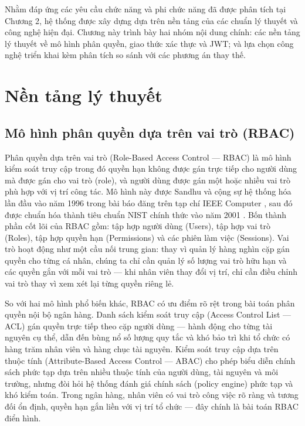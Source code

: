 \documentclass[../DoAn.tex]{subfiles}
\begin{document}
Nhằm đáp ứng các yêu cầu chức năng và phi chức năng đã được phân tích tại Chương 2, hệ thống được xây dựng dựa trên nền tảng của các chuẩn lý thuyết và công nghệ hiện đại. Chương này trình bày hai nhóm nội dung chính: các nền tảng lý thuyết về mô hình phân quyền, giao thức xác thực và JWT; và lựa chọn công nghệ triển khai kèm phân tích so sánh với các phương án thay thế.

\section{Nền tảng lý thuyết}
\label{section:3.1}

\subsection{Mô hình phân quyền dựa trên vai trò (RBAC)}
\label{subsection:3.1.1}

Phân quyền dựa trên vai trò (Role-Based Access Control — RBAC) là mô hình kiểm soát truy cập trong đó quyền hạn không được gán trực tiếp cho người dùng mà được gán cho vai trò (role), và người dùng được gán một hoặc nhiều vai trò phù hợp với vị trí công tác. Mô hình này được Sandhu và cộng sự hệ thống hóa lần đầu vào năm 1996 trong bài báo đăng trên tạp chí IEEE Computer \cite{sandhu1996rbac}, sau đó được chuẩn hóa thành tiêu chuẩn NIST chính thức vào năm 2001 \cite{ferraiolo2001rbac}. Bốn thành phần cốt lõi của RBAC gồm: tập hợp người dùng (Users), tập hợp vai trò (Roles), tập hợp quyền hạn (Permissions) và các phiên làm việc (Sessions). Vai trò hoạt động như một cầu nối trung gian: thay vì quản lý hàng nghìn cặp gán quyền cho từng cá nhân, chúng ta chỉ cần quản lý số lượng vai trò hữu hạn và các quyền gắn với mỗi vai trò — khi nhân viên thay đổi vị trí, chỉ cần điều chỉnh vai trò thay vì xem xét lại từng quyền riêng lẻ.

So với hai mô hình phổ biến khác, RBAC có ưu điểm rõ rệt trong bài toán phân quyền nội bộ ngân hàng. Danh sách kiểm soát truy cập (Access Control List — ACL) gán quyền trực tiếp theo cặp người dùng — hành động cho từng tài nguyên cụ thể, dẫn đến bùng nổ số lượng quy tắc và khó bảo trì khi tổ chức có hàng trăm nhân viên và hàng chục tài nguyên. Kiểm soát truy cập dựa trên thuộc tính (Attribute-Based Access Control — ABAC) cho phép biểu diễn chính sách phức tạp dựa trên nhiều thuộc tính của người dùng, tài nguyên và môi trường, nhưng đòi hỏi hệ thống đánh giá chính sách (policy engine) phức tạp và khó kiểm toán. Trong ngân hàng, nhân viên có vai trò công việc rõ ràng và tương đối ổn định, quyền hạn gắn liền với vị trí tổ chức — đây chính là bài toán RBAC điển hình.
\end{document}
